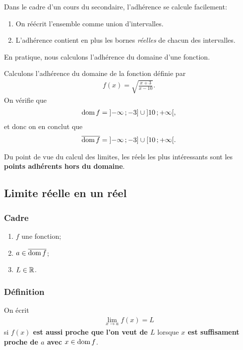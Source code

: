 \documentclass[main.tex]{subfiles}
\begin{document}
Dans le cadre d'un cours du secondaire,
l'adhérence se calcule facilement:
\begin{howto}

    \begin{enumerate}
        \item On réécrit l'ensemble comme union d'intervalles.
        \item L'adhérence contient en plus les bornes \emph{réelles} de chacun des intervalles.
    \end{enumerate}
\end{howto}

En pratique,
nous calculons l'adhérence du domaine d'une fonction.

\begin{example}

    Calculons l'adhérence du domaine de la fonction définie par
    \begin{align}
        f(x) = \sqrt{\frac {x + 3}{x - 10}}.
    \end{align}
    On vérifie que
    \begin{align}
        \operatorname{dom} f = \mathopen{]}-\infty\,;-3\mathclose{]} \cup \mathopen{]}10\,;+\infty\mathclose{[},
    \end{align}
    et donc on en conclut que
    \begin{align}
        \overline{\operatorname{dom} f} = \mathopen{]}-\infty\,;-3\mathclose{]} \cup \mathopen{[}10\,;+\infty\mathclose{[}.
    \end{align}
\end{example}

Du point de vue du calcul des limites,
les réels les plus intéressants sont les \textbf{points adhérents hors du domaine}.

\subsection{Limite réelle en un réel}

\begin{definition}

    \subsubsection*{Cadre}
    \begin{enumerate}
        \item $f$ une fonction;
        \item $a \in \overline{\operatorname{dom} f}$;
        \item $L \in \mathbb{R}$.
    \end{enumerate}

    \subsubsection*{Définition}
    On écrit
    \begin{align}
        \lim_{x \to a} f(x) = L
    \end{align}
    si \textbf{$f(x)$ est aussi proche que l'on veut de $L$}
    lorsque \textbf{$x$ est suffisament proche de $a$ avec $x \in \operatorname{dom} f$}.
\end{definition}
\end{document}
